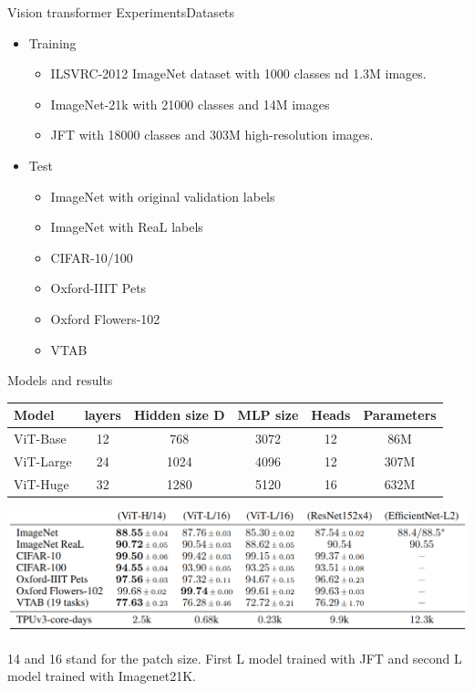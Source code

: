 \documentclass{beamer}
\begin{document}
\begin{frame}{Vision transformer Experiments}{Datasets}
\begin{itemize}
\item Training 
\begin{itemize}
    \item ILSVRC-2012 ImageNet dataset with 1000 classes nd  1.3M  images.
    \item ImageNet-21k  with 21000 classes and 14M images 
    \item JFT  with 18000 classes and 303M high-resolution images.  
    
    
\end{itemize}
\item Test
\begin{itemize}
\item  ImageNet with original validation labels 
\item ImageNet with  ReaL labels 
\item CIFAR-10/100 
\item Oxford-IIIT Pets
\item Oxford Flowers-102 
\item VTAB
\end{itemize}
\end{itemize}
\end{frame}

\begin{frame}{Models and results}
    \begin{table}[]
\begin{tabular}{lccccc}
Model     & layers & Hidden size D & MLP size & Heads & Parameters \\ \hline
ViT-Base  & 12     & 768           & 3072     & 12    & 86M        \\
ViT-Large & 24     & 1024          & 4096     & 12    & 307M       \\
ViT-Huge  & 32     & 1280          & 5120     & 16    & 632M       \\ \hline
\end{tabular}
\end{table}
\begin{center}
    \includegraphics[scale=0.18]{Module 6 (Attention-based networks)/pics/resultsViT.png}
\end{center}
14 and 16 stand for the patch size. First L model trained with JFT and second L model trained with Imagenet21K. 
\end{frame}
\end{document}
